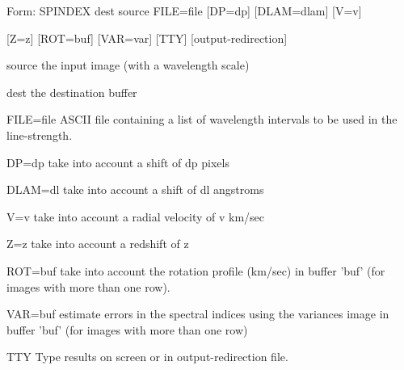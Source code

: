 {\newpage\clearpage
{}%
\begin{command}
  \item[Form: SPINDEX dest source FILE=file {[DP=dp]} {[DLAM=dlam]} 
       {[V=v]}\hfill]{}
  \item{{[Z=z]} {[ROT=buf]} {[VAR=var]} {[TTY]} {[output-redirection]}}
  \item[source]{the input image (with a wavelength scale)}
  \item[dest]{the destination buffer}
  \item[FILE=file]{ASCII file containing a list of wavelength intervals
       to be used in the line-strength.}
  \item[DP=dp]{take into account a shift of dp pixels}
  \item[DLAM=dl]{take into account a shift of dl angstroms}
  \item[V=v]{take into account a radial velocity of v km/sec}
  \item[Z=z]{take into account a redshift of z}
  \item[ROT=buf]{take into account the rotation profile (km/sec)
       in buffer 'buf' (for images with more than one row).}
  \item[VAR=buf]{estimate errors in the spectral indices using the
       variances image in buffer 'buf' (for images with more
       than one row)}
  \item[TTY]{Type results on screen or in output-redirection file.}
\end{command}%
\lthtmlfigureZ
\lthtmlcheckvsize\clearpage}

